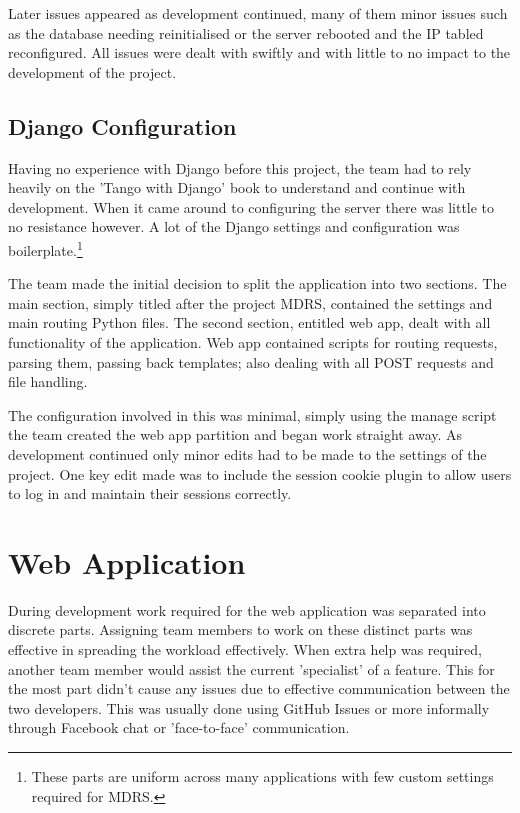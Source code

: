 \documentclass{l3proj}
\begin{document}
Later issues appeared as development continued, many of them minor issues such as the database needing reinitialised or the server rebooted and the IP tabled reconfigured. All issues were dealt with swiftly and with little to no impact to the development of the project.

\subsection{Django Configuration}		Having no experience with Django before this project, the team had to rely heavily on the 'Tango with Django' book\cite{tangoWithDjango} to understand and continue with development. When it came around to configuring the server there was little to no resistance however. A lot of the Django settings and configuration was  boilerplate.\footnote{These parts are uniform across many applications with few custom settings required for MDRS.}

The team made the initial decision to split the application into two sections. The main section, simply titled after the project MDRS, contained the settings and main routing \gls{Python} files. The second section, entitled web app, dealt with all functionality of the application. Web app contained scripts for routing requests, parsing them, passing back templates; also dealing with all POST requests and file handling.

The configuration involved in this was minimal, simply using the manage script the team created the web app partition and began work straight away. As development continued only minor edits had to be made to the settings of the project. One key edit made was to include the session cookie plugin to allow users to log in and maintain their sessions correctly.

\section{Web Application}		During development work required for the web application was separated into discrete parts. Assigning team members to work on these distinct parts was effective in spreading the workload effectively. When extra help was required, another team member would assist the current 'specialist' of a feature. This for the most part didn't cause any issues due to effective communication between the two developers. This was usually done using GitHub Issues or more informally through Facebook chat or 'face-to-face' communication.
\end{document}
